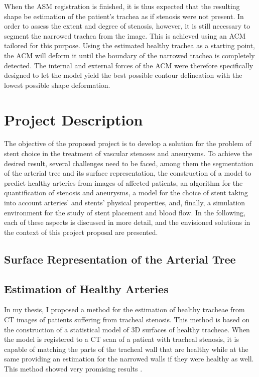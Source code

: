 \documentclass[a4paper]{article}
\begin{document}
When the ASM registration is finished, it is thus expected that the
resulting shape be estimation of the patient’s trachea as if stenosis were
not present. In order to assess the extent and degree of stenosis, however,
it is still necessary to segment the narrowed trachea from the image.
This is achieved using an ACM tailored for this purpose. Using the estimated
healthy trachea as a starting point, the ACM will deform it until the
boundary of the narrowed trachea is completely detected. The internal and
external forces of the ACM were therefore specifically designed to let the
model yield the best possible contour delineation with the lowest possible
shape deformation.

\section{Project Description}

The objective of the proposed project is to develop a solution for the problem of stent choice in the treatment of vascular stenoses and aneurysms. To achieve the desired result, several challenges need to be faced, among them the segmentation of the arterial tree and its surface representation, the construction of a model to predict healthy arteries from images of affected patients, an algorithm for the quantification of stenosis and aneurysms, a model for the choice of stent taking into account arteries' and stents' physical properties, and, finally, a simulation environment for the study of stent placement and blood flow. In the following, each of these aspects is discussed in more detail, and the envisioned solutions in the context of this project proposal are presented.

\subsection{Surface Representation of the Arterial Tree}

\subsection{Estimation of Healthy Arteries}

In my thesis, I proposed a method for the estimation of healthy tracheae from CT images of patients suffering from tracheal stenosis. This method is based on the construction of a statistical model \citep{Cootes} of 3D surfaces of healthy tracheae. When the model is registered to a CT scan of a patient with tracheal stenosis, it is capable of matching the parts of the tracheal wall that are healthy while at the same providing an estimation for the narrowed walls if they were healthy as well. This method showed very promising results \citep{Pinho:Trachea4}.
\end{document}
